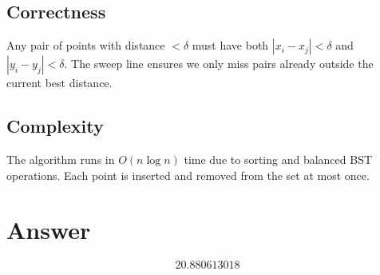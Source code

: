 \documentclass[12pt]{article}
\begin{document}
\subsection{Correctness}
Any pair of points with distance $< \delta$ must have both $|x_i - x_j| < \delta$ and $|y_i - y_j| < \delta$. The sweep line ensures we only miss pairs already outside the current best distance.

\subsection{Complexity}
The algorithm runs in $O(n \log n)$ time due to sorting and balanced BST operations. Each point is inserted and removed from the set at most once.

\section{Answer}

\[
\boxed{20.880613018}
\]
\end{document}
